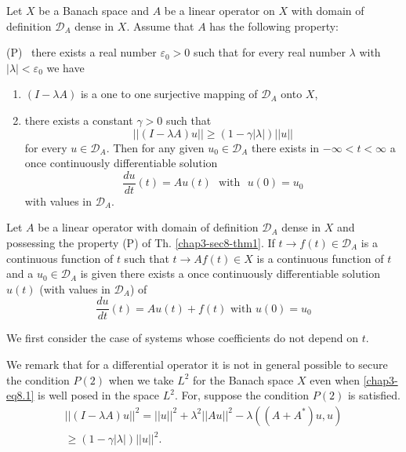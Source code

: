 \setcounter{theorem}{0}
\begin{theorem}\label{chap3-sec8-thm1}%
 Let $X$ be a Banach space and $A$ be a linear
operator on $X$ with domain of definition $\mathscr{D}_A$ dense in
$X$. Assume that $A$ has the following property: 

{\rm(P)}~ there exists a real number $\varepsilon_0 > 0$ such that
for every real number $\lambda$ with $|\lambda| < \varepsilon_0$ we
have  
\begin{enumerate}
\renewcommand{\labelenumi}{\rm(\theenumi)}
\item $(I - \lambda A)$ is a one to one surjective mapping of
  $\mathscr{D}_A$ onto $X$,  

\item there exists a constant $\gamma > 0$ such that  
$$
|| (I - \lambda A) u|| \geq (1 - \gamma | \lambda |) || u || 
$$
for every $u \in \mathscr{D}_A$. Then for any given $u_0 \in
\mathscr{D}_A$ there exists in $-\infty< t< \infty$ a once
continuously differentiable solution  
\begin{equation*}
\frac{du}{dt} (t) = Au(t) \text{~ with~ } u(0) = u_0
\tag{8.1}\label{chap3-eq8.1} 
\end{equation*}
with values in $\mathscr{D}_A$.
\end{enumerate}
\end{theorem}

\begin{coro*}%
Let $A$ be a linear operator with domain of definition $\mathscr{D}_A$
dense in $X$ and possessing the property (P) of
Th. \ref{chap3-sec8-thm1}. If $t \to f(t) 
\in \mathscr{D}_A$ is a continuous function of $t$ such that $t\to Af(t)\in X$
is a continuous function of $t$ and a $u_0\in\mathscr{D}_A$ is given
there exists a 
once continuously differentiable solution $u(t)$ (with values in
$\mathscr{D}_A$) of  
\begin{equation*}
\frac{du}{dt} (t) = Au (t) + f(t) \text{ with } u(0) = u_0
\tag{8.2}\label{chap3-eq8.2} 
\end{equation*}\pageoriginale
\end{coro*}

We first consider the case of systems whose coefficients do not depend
on $t$. 

We remark that for a differential operator it is not in general
possible to secure the condition $P(2)$ when we take $L^2$ for the
Banach space $X$ even when \eqref{chap3-eq8.1} is well posed in the space
$L^2$. For, suppose the condition $P(2)$ is satisfied. 
\begin{gather*}
|| (I - \lambda A) u ||^2  = || u ||^2 + \lambda^2 || Au ||^2 -
\lambda (( A + A^*) u, u)\\ 
 \geq (1- \gamma| \lambda|)  || u ||^2.
\end{gather*}

